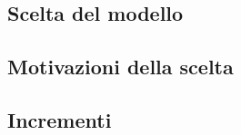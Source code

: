 \subsection{Scelta del modello}\label{sec:Scelta-modello}


\subsection{Motivazioni della scelta}\label{sec:Motivazioni}


\subsection{Incrementi}\label{sec:Incrementi}

    
